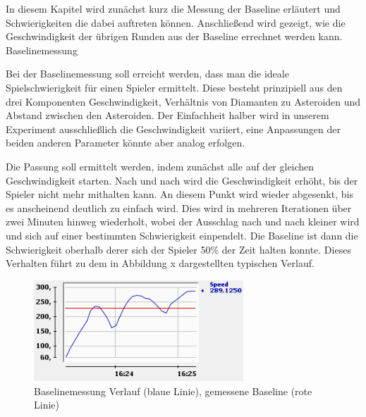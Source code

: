 \documentclass[a4paper,12pt]{scrartcl}
\begin{document}
In diesem Kapitel wird zunächst kurz die Messung der Baseline erläutert und
Schwierigkeiten die dabei auftreten können. Anschließend wird gezeigt, wie die
Geschwindigkeit der übrigen Runden aus der Baseline errechnet werden kann.
Baselinemessung

Bei der Baselinemessung soll erreicht werden, dass man die ideale Spielschwierigkeit für
einen Spieler ermittelt. Diese besteht prinzipiell aus den drei Komponenten Geschwindigkeit,
Verhältnis von Diamanten zu Asteroiden und Abstand zwischen den Asteroiden. Der
Einfachheit halber wird in unserem Experiment ausschließlich die Geschwindigkeit variiert,
eine Anpassungen der beiden anderen Parameter könnte aber analog erfolgen.

Die Passung soll ermittelt werden, indem zunächst alle auf der gleichen Geschwindigkeit
starten. Nach und nach wird die Geschwindigkeit erhöht, bis der Spieler nicht mehr mithalten
kann. An diesem Punkt wird wieder abgesenkt, bis es anscheinend deutlich zu einfach
wird. Dies wird in mehreren Iterationen über zwei Minuten hinweg wiederholt, wobei
der Ausschlag nach und nach kleiner wird und sich auf einer bestimmten Schwierigkeit
einpendelt. Die Baseline ist dann die Schwierigkeit oberhalb derer sich der
Spieler 50\% der Zeit halten konnte. Dieses Verhalten führt zu dem in Abbildung x dargestellten typischen
Verlauf.

\begin{figure}[htp]
\begin{center}
  \includegraphics[width=0.7\textwidth]{Baseline.png}
  \caption[Baselinemessungsverlauf]{Baselinemessung Verlauf (blaue Linie),
  gemessene Baseline (rote Linie)}
  \label{fig:Baseline}
\end{center}
\end{figure} 
\end{document}
